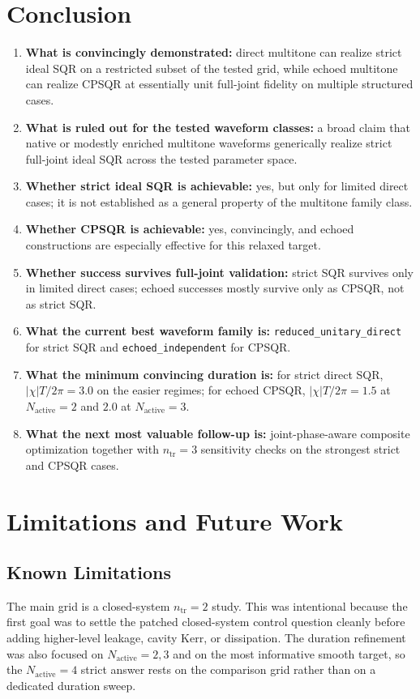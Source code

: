 \documentclass[aps,pra,twocolumn,reprint,floatfix,amsmath,amssymb]{revtex4-2}
\begin{document}
\section{Conclusion}
\begin{enumerate}
    \item \textbf{What is convincingly demonstrated:} direct multitone can realize strict ideal SQR on a restricted subset of the tested grid, while echoed multitone can realize CPSQR at essentially unit full-joint fidelity on multiple structured cases.
    \item \textbf{What is ruled out for the tested waveform classes:} a broad claim that native or modestly enriched multitone waveforms generically realize strict full-joint ideal SQR across the tested parameter space.
    \item \textbf{Whether strict ideal SQR is achievable:} yes, but only for limited direct cases; it is not established as a general property of the multitone family class.
    \item \textbf{Whether CPSQR is achievable:} yes, convincingly, and echoed constructions are especially effective for this relaxed target.
    \item \textbf{Whether success survives full-joint validation:} strict SQR survives only in limited direct cases; echoed successes mostly survive only as CPSQR, not as strict SQR.
    \item \textbf{What the current best waveform family is:} \texttt{reduced\_unitary\_direct} for strict SQR and \texttt{echoed\_independent} for CPSQR.
    \item \textbf{What the minimum convincing duration is:} for strict direct SQR, $|\chi|T/2\pi=3.0$ on the easier regimes; for echoed CPSQR, $|\chi|T/2\pi=1.5$ at $N_{\mathrm{active}}=2$ and $2.0$ at $N_{\mathrm{active}}=3$.
    \item \textbf{What the next most valuable follow-up is:} joint-phase-aware composite optimization together with $n_{\mathrm{tr}}=3$ sensitivity checks on the strongest strict and CPSQR cases.
\end{enumerate}

\section{Limitations and Future Work}
\subsection{Known Limitations}
The main grid is a closed-system $n_{\mathrm{tr}}=2$ study. This was intentional because the first goal was to settle the patched closed-system control question cleanly before adding higher-level leakage, cavity Kerr, or dissipation. The duration refinement was also focused on $N_{\mathrm{active}}=2,3$ and on the most informative smooth target, so the $N_{\mathrm{active}}=4$ strict answer rests on the comparison grid rather than on a dedicated duration sweep.
\end{document}

